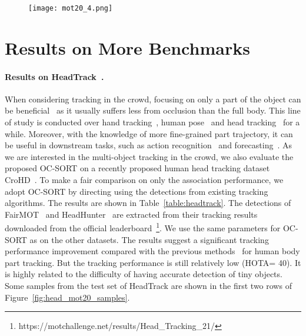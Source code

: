 \documentclass[10pt,twocolumn,letterpaper]{article}
\begin{document}
\begin{figure*}
\begin{subfigure}{.24\textwidth}
  \centering
  \texttt{[image: mot20\_4.png]}
  \label{fig:head10}
\end{subfigure}\vspace{-0.2cm}
\caption{The visualization of the output of OC-SORT on randomly selected samples from the test set of HeadTrack~\cite{headtrack} (the first two rows) and MOT20~\cite{dendorfer2020mot20} (the bottom row). These two datasets are both challenging because of the crowded scenes where pedestrians have heavy occlusion with each other. OC-SORT achieves superior performance on both datasets.}
\label{fig:head_mot20_samples}
\end{figure*}


\section{Results on More Benchmarks}
\label{sec:app_more_benchmark}
\paragraph{Results on HeadTrack~\cite{headtrack}.} When considering tracking in the crowd, focusing on only a part of the object can be beneficial~\cite{caopartwhole} as it usually suffers less from occlusion than the full body. This line of study is conducted over hand tracking~\cite{hand3dtrack,handtrack}, human pose~\cite{poseflow} and head tracking~\cite{headtrack,basu1996motion,peng2018detecting} for a while. Moreover, with the knowledge of more fine-grained part trajectory, it can be useful in downstream tasks, such as action recognition~\cite{fang2018pairwise,gall2011hough} and forecasting~\cite{kitani2012activity,cao2019cross,kothari2021human,chang2019argoverse}. As we are interested in the multi-object tracking in the crowd, we also evaluate the proposed OC-SORT on a recently proposed human head tracking dataset CroHD~\cite{headtrack}. 
To make a fair comparison on only the association performance, we adopt OC-SORT by directing using the detections from existing tracking algorithms. The results are shown in Table~\ref{table:headtrack}. The detections of FairMOT~\cite{zhang2021fairmot} and HeadHunter~\cite{headtrack} are extracted from their tracking results downloaded from the official leaderboard~\footnote{https://motchallenge.net/results/Head\_Tracking\_21/}. We use the same parameters for OC-SORT as on the other datasets. The results suggest a significant tracking performance improvement compared with the previous methods~\cite{headtrack,zhang2021fairmot} for human body part tracking. But the tracking performance is still relatively low (HOTA= 40). It is highly related to the difficulty of having accurate detection of tiny objects. Some samples from the test set of HeadTrack are shown in the first two rows of Figure~\ref{fig:head_mot20_samples}.
\vspace{-0.5cm}
\end{document}
